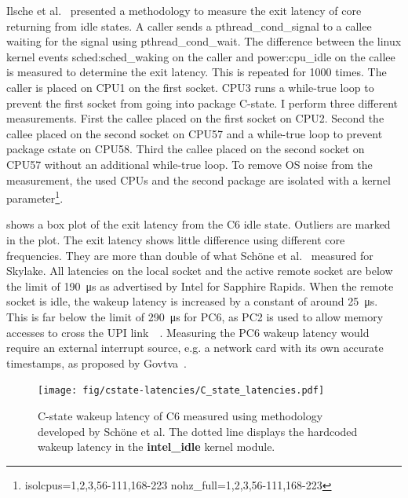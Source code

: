 Ilsche et al.~\cite{Ilsche_2018_cstate} presented a methodology to measure the exit latency of core returning from idle states.
A caller sends a pthread\_cond\_signal to a callee waiting for the signal using pthread\_cond\_wait.
The difference between the linux kernel events sched:sched\_waking on the caller and power:cpu\_idle on the callee is measured to determine the exit latency.
This is repeated for \SI{1000}{} times.
The caller is placed on CPU1 on the first socket.
CPU3 runs a while-true loop to prevent the first socket from going into package C-state.
I perform three different measurements.
First the callee placed on the first socket on CPU2.
Second the callee placed on the second socket on CPU57 and a while-true loop to prevent package cstate on CPU58.
Third the callee placed on the second socket on CPU57 without an additional while-true loop.
To remove OS noise from the measurement, the used CPUs and the second package are isolated with a kernel parameter\footnote{isolcpus=1,2,3,56-111,168-223 nohz\_full=1,2,3,56-111,168-223}.

 shows a box plot of the exit latency from the C6 idle state.
Outliers are marked in the plot.
The exit latency shows little difference using different core frequencies.
They are more than double of what Schöne et al.~\cite{Schoene_2019_SKL} measured for Skylake.
All latencies on the local socket and the active remote socket are below the limit of \SI{190}{\us} as advertised by Intel for Sapphire Rapids.
When the remote socket is idle, the wakeup latency is increased by a constant of around \SI{25}{\us}.
This is far below the limit of \SI{290}{\us} for PC6, as PC2 is used to allow memory accesses to cross the UPI link~\cite{Intel_PowerManagementTechnologyReviewIceLake}~\cite[p.~48]{EnergyEfficientServers_2015}.
Measuring the PC6 wakeup latency would require an external interrupt source, e.g. a network card with its own accurate timestamps, as proposed by Govtva~\cite{Govtva_2019}.

\begin{figure}[!ht]
    \centering
    \texttt{[image: fig/cstate-latencies/C\_state\_latencies.pdf]}
    \caption{\label{fig:c6_latencies}C-state wakeup latency of C6 measured using methodology developed by Schöne et al.
The dotted line displays the hardcoded wakeup latency in the \protect\textbf{intel\_idle} kernel module.
\protect\footnotemark}
\end{figure}
